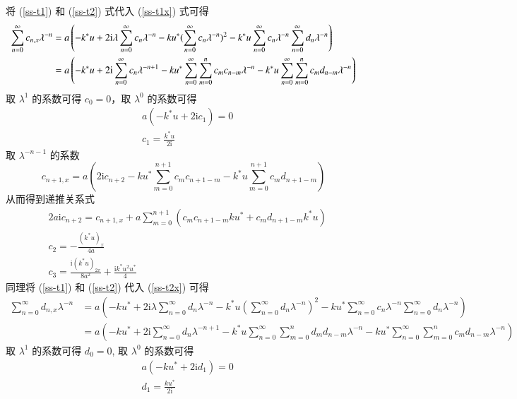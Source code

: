 将 (\ref{ss-t1}) 和 (\ref{ss-t2}) 式代入  (\ref{ss-t1x}) 式可得
\begin{align}
  \sum_{n=0}^{\infty}c_{n,x}\lambda^{-n} &= a\left(-k^{*}u + 2\mathrm{i}\lambda\sum_{n=0}^{\infty}c_{n}\lambda^{-n} - ku^{*}(\sum_{n=0}^{\infty}c_{n}\lambda^{-n})^{2} - k^{*}u\sum_{n=0}^{\infty}c_{n}\lambda^{-n}\sum_{n=0}^{\infty}d_{n}\lambda^{-n}\right) \notag\\
  &= a\left(-k^{*}u + 2\mathrm{i}\sum_{n=0}^{\infty}c_{n}\lambda^{-n+1} - ku^{*}\sum_{n=0}^{\infty}\sum_{m=0}^{n}c_{m}c_{n-m}\lambda^{-n} - k^{*}u\sum_{n=0}^{\infty}\sum_{m=0}^{n}c_{m}d_{n-m}\lambda^{-n}\right)
\end{align}
取 $\lambda^{1}$ 的系数可得 $c_{0} = 0$，取 $\lambda^{0}$ 的系数可得
\begin{align}
  & a(-k^{*}u + 2\mathrm{i}c_{1}) = 0 \\
  & c_{1} = \frac{k^{*}u}{2\mathrm{i}}
\end{align}
取 $\lambda^{-n-1}$ 的系数
\begin{equation}
  c_{n+1,x} = a\left(2\mathrm{i}c_{n+2} - ku^{*}\sum_{m=0}^{n+1}c_{m}c_{n+1-m} - k^{*}u\sum_{m=0}^{n+1}c_{m}d_{n+1-m}\right)
\end{equation}
从而得到递推关系式
\begin{align}
  & 2a\mathrm{i}c_{n+2} = c_{n+1,x} + a\sum_{m=0}^{n+1}(c_{m}c_{n+1-m}ku^{*} + c_{m}d_{n+1-m}k^{*}u) \\
  & c_{2} = -\frac{(k^{*}u)_{x}}{4a} \\
  & c_{3} = \frac{\mathrm{i}(k^{*}u)_{2x}}{8a^{2}} + \frac{\mathrm{i}k^{*}u^{2}u^{*}}{4}
\end{align}
同理将 (\ref{ss-t1}) 和 (\ref{ss-t2}) 代入 (\ref{ss-t2x}) 可得
\begin{align}
\sum_{n=0}^{\infty}d_{n,x}\lambda^{-n} &=a\left(-ku^*+2\mathrm{i}\lambda \sum_{n=0}^{\infty}d_n\lambda^{-n}-k^*u(\sum_{n=0}^{\infty}d_n\lambda^{-n})^2-ku^*\sum_{n=0}^{\infty}c_n\lambda^{-n}\sum_{n=0}^{\infty}d_n\lambda^{-n}\right)\nonumber\\
	&=a\left(-ku^*+2\mathrm{i} \sum_{n=0}^{\infty}d_n\lambda^{-n+1}-k^*u\sum_{n=0}^{\infty}\sum_{m=0}^{n}d_md_{n-m}\lambda^{-n}-ku^*\sum_{n=0}^{\infty}\sum_{m=0}^{n}c_md_{n-m}\lambda^{-n}\right)\nonumber
\end{align}
取 $\lambda^1$ 的系数可得 $d_0=0$, 取 $\lambda^0$ 的系数可得
\begin{align}
	&a(-ku^*+2\mathrm{i}d_1)=0\nonumber\\
	&d_1=\frac{ku^*}{2\mathrm{i}}\nonumber
\end{align}
